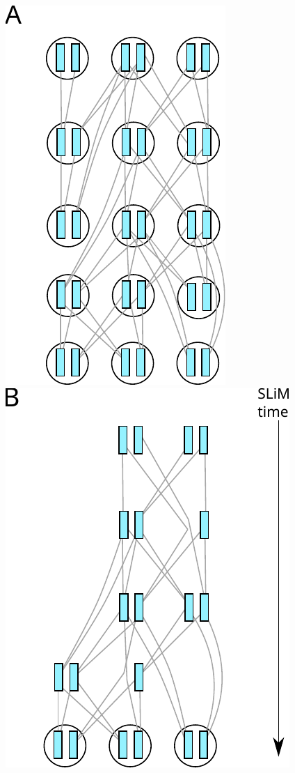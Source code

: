 \documentclass[12pt]{article}
\begin{document}
\begin{figure}
\centering
    \includegraphics{figures/pedigree0}
    \includegraphics{figures/pedigree1}

\end{figure}
\end{document}
